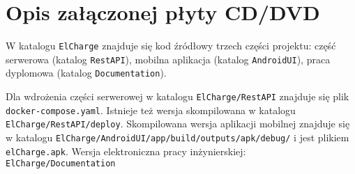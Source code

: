 \chapter{Opis załączonej płyty CD/DVD}
W katalogu \texttt{ElCharge} znajduje się kod źródłowy trzech części projektu: część serwerowa (katalog \texttt{RestAPI}), mobilna aplikacja (katalog \texttt{AndroidUI}), praca dyplomowa (katalog \texttt{Documentation}).

Dla wdrożenia części serwerowej w katalogu \texttt{ElCharge/RestAPI} znajduje się plik \texttt{docker-compose.yaml}. Istnieje też wersja skompilowana w katalogu \texttt{ElCharge/RestAPI/deploy}.
Skompilowana wersja aplikacji mobilnej znajduje się w katalogu \texttt{ElCharge/AndroidUI/app/build/outputs/apk/debug/} i jest plikiem \texttt{elCharge.apk}.
Wersja elektroniczna pracy inżynierskiej: \texttt{ElCharge/Documentation}